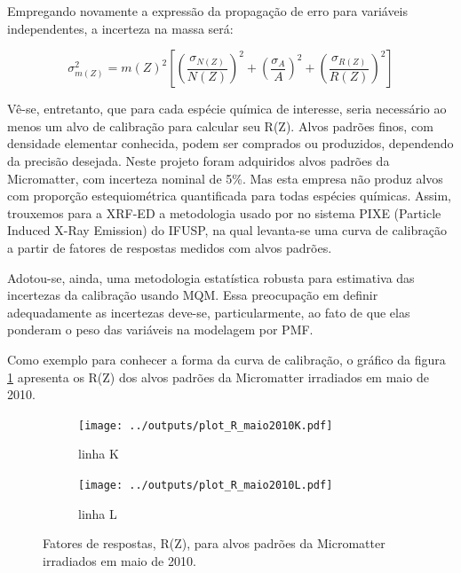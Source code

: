 Empregando novamente a expressão da propagação de erro para variáveis 
independentes, a incerteza na massa será:

\begin{equation}
  \label{eq:erro_massa}
  \sigma_{m(Z)}^2 = {m(Z)}^2 \left[ \left(\frac{\sigma_{N(Z)}}{N(Z)}\right)^2 + 
                                  \left(\frac{\sigma_A}{A}\right)^2 + 
                                  \left(\frac{\sigma_{R(Z)}}{R(Z)}\right)^2 
                             \right]
\end{equation}


Vê-se, entretanto, que para cada espécie química de interesse, seria necessário
ao menos um alvo de calibração para calcular seu R(Z). Alvos padrões finos, 
com densidade elementar conhecida, podem ser comprados ou produzidos, dependendo
da precisão desejada. Neste projeto foram adquiridos alvos padrões da 
Micromatter, com incerteza nominal de 5\%. Mas esta empresa não produz alvos 
com proporção estequiométrica quantificada para todas espécies químicas.
Assim, trouxemos para a XRF-ED a metodologia usado por \citet{tabacniks2000}
no sistema PIXE (Particle Induced X-Ray Emission) do IFUSP, na qual levanta-se 
uma curva de calibração a partir de fatores de respostas medidos com 
alvos padrões. 
 
Adotou-se, ainda, uma metodologia estatística robusta para estimativa das 
incertezas da calibração usando MQM. Essa preocupação em definir 
adequadamente as incertezas deve-se, particularmente, ao fato de que elas 
ponderam o peso das variáveis na modelagem por PMF.

Como exemplo para conhecer a forma da curva de calibração, o gráfico da figura 
\ref{fg:edxrfcalib} apresenta os R(Z) dos alvos padrões da Micromatter 
irradiados em maio de 2010. 

\begin{figure}[H]
  \begin{subfigure}[b]{0.45\textwidth}
    \texttt{[image: ../outputs/plot\_R\_maio2010K.pdf]}
    \caption{linha K}
  \end{subfigure}%
  \begin{subfigure}[b]{0.45\textwidth}
    \texttt{[image: ../outputs/plot\_R\_maio2010L.pdf]}
    \caption{linha L}
  \end{subfigure}
  \caption{Fatores de respostas, R(Z), para alvos padrões da 
           Micromatter irradiados em maio de 2010. 
           \label{fg:edxrfcalib}}
\end{figure}

